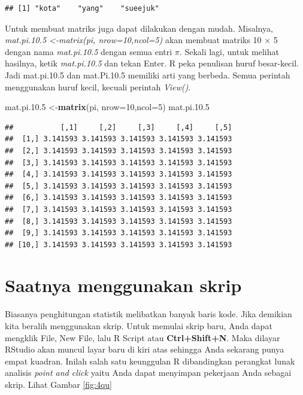 \documentclass[a4paper, nobind]{templates/ociamthesis}
\newenvironment{Shaded}{\begin{snugshade}}{\end{snugshade}}
\newcommand{\AttributeTok}[1]{\textcolor[rgb]{0.13,0.29,0.53}{#1}}
\newcommand{\DecValTok}[1]{\textcolor[rgb]{0.00,0.00,0.81}{#1}}
\newcommand{\FloatTok}[1]{\textcolor[rgb]{0.00,0.00,0.81}{#1}}
\newcommand{\FunctionTok}[1]{\textcolor[rgb]{0.13,0.29,0.53}{\textbf{#1}}}
\newcommand{\NormalTok}[1]{#1}
\newcommand{\OtherTok}[1]{\textcolor[rgb]{0.56,0.35,0.01}{#1}}
\renewenvironment{Shaded}
{
  \vspace{10pt}%
  \begin{snugshade}%
}{%
  \end{snugshade}%
  \vspace{8pt}%
}
\begin{document}
\begin{verbatim}
## [1] "kota"    "yang"    "sueejuk"
\end{verbatim}

Untuk membuat matriks juga dapat dilakukan dengan mudah. Misalnya, \emph{mat.pi.10.5 \textless-matrix(pi, nrow=10,ncol=5)} akan membuat matriks 10 × 5 dengan nama \emph{mat.pi.10.5} dengan semua entri \(\pi\). Sekali lagi, untuk melihat hasilnya, ketik \emph{mat.pi.10.5} dan tekan Enter. R peka penulisan huruf besar-kecil. Jadi mat.pi.10.5 dan mat.Pi.10.5 memiliki arti yang berbeda. Semua perintah menggunakan huruf kecil, kecuali perintah \emph{View()}.

\begin{Shaded}
\begin{Highlighting}[]
\NormalTok{mat.pi.}\FloatTok{10.5} \OtherTok{\textless{}{-}}\FunctionTok{matrix}\NormalTok{(pi, }\AttributeTok{nrow=}\DecValTok{10}\NormalTok{,}\AttributeTok{ncol=}\DecValTok{5}\NormalTok{)}
\NormalTok{mat.pi.}\FloatTok{10.5}
\end{Highlighting}
\end{Shaded}

\begin{verbatim}
##           [,1]     [,2]     [,3]     [,4]     [,5]
##  [1,] 3.141593 3.141593 3.141593 3.141593 3.141593
##  [2,] 3.141593 3.141593 3.141593 3.141593 3.141593
##  [3,] 3.141593 3.141593 3.141593 3.141593 3.141593
##  [4,] 3.141593 3.141593 3.141593 3.141593 3.141593
##  [5,] 3.141593 3.141593 3.141593 3.141593 3.141593
##  [6,] 3.141593 3.141593 3.141593 3.141593 3.141593
##  [7,] 3.141593 3.141593 3.141593 3.141593 3.141593
##  [8,] 3.141593 3.141593 3.141593 3.141593 3.141593
##  [9,] 3.141593 3.141593 3.141593 3.141593 3.141593
## [10,] 3.141593 3.141593 3.141593 3.141593 3.141593
\end{verbatim}

\hypertarget{saatnya-menggunakan-skrip}{%
\section{Saatnya menggunakan skrip}\label{saatnya-menggunakan-skrip}}

Biasanya penghitungan statistik melibatkan banyak baris kode. Jika demikian kita beralih menggunakan skrip. Untuk memulai skrip baru, Anda dapat mengklik File, New File, lalu R Script atau \textbf{Ctrl+Shift+N}. Maka dilayar RStudio akan muncul layar baru di kiri atas sehingga Anda sekarang punya empat kuadran. Inilah salah satu keunggulan R dibandingkan perangkat lunak analisis \emph{point and click} yaitu Anda dapat menyimpan pekerjaan Anda sebagai skrip. Lihat Gambar \ref{fig:4qu}
\end{document}
